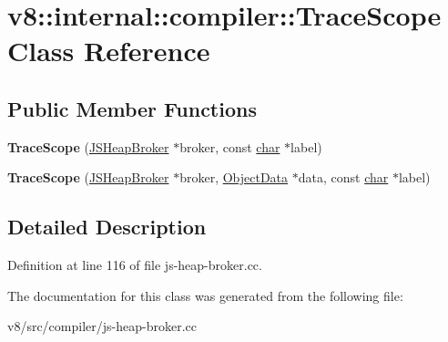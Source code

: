 \hypertarget{classv8_1_1internal_1_1compiler_1_1TraceScope}{}\section{v8\+:\+:internal\+:\+:compiler\+:\+:Trace\+Scope Class Reference}
\label{classv8_1_1internal_1_1compiler_1_1TraceScope}
\subsection*{Public Member Functions}
\begin{DoxyCompactItemize}
\item 
\mbox{\label{classv8_1_1internal_1_1compiler_1_1TraceScope_a94383776680e53efd81681124af5ec9a}} 
{\bfseries Trace\+Scope} (\mbox{\hyperlink{classv8_1_1internal_1_1compiler_1_1JSHeapBroker}{J\+S\+Heap\+Broker}} $\ast$broker, const \mbox{\hyperlink{classchar}{char}} $\ast$label)
\item 
\mbox{\label{classv8_1_1internal_1_1compiler_1_1TraceScope_ad345d2d1fd285e5e9e9ec5bc83f532a7}} 
{\bfseries Trace\+Scope} (\mbox{\hyperlink{classv8_1_1internal_1_1compiler_1_1JSHeapBroker}{J\+S\+Heap\+Broker}} $\ast$broker, \mbox{\hyperlink{classv8_1_1internal_1_1compiler_1_1ObjectData}{Object\+Data}} $\ast$data, const \mbox{\hyperlink{classchar}{char}} $\ast$label)
\end{DoxyCompactItemize}


\subsection{Detailed Description}


Definition at line 116 of file js-\/heap-\/broker.\+cc.



The documentation for this class was generated from the following file\+:\begin{DoxyCompactItemize}
\item 
v8/src/compiler/js-\/heap-\/broker.\+cc\end{DoxyCompactItemize}
